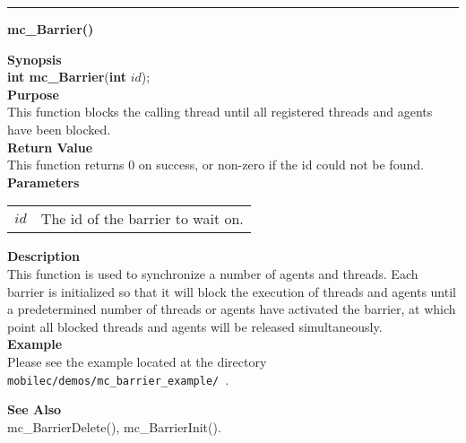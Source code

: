 \noindent
\vspace{5pt}
\rule{6.5in}{0.015in}
\noindent
{}
{\LARGE \bf mc\_Barrier()}\\
\label{api:mc_Barrier()}

\noindent
{\bf Synopsis}\\
{\bf int mc\_Barrier}({\bf int} $id$);\\

\noindent
{\bf Purpose}\\
This function blocks the calling thread until all registered threads and
agents have been blocked. \\

\noindent
{\bf Return Value}\\
This function returns 0 on success, or non-zero if the id could not be found. \\

\noindent
{\bf Parameters}
\vspace{-0.1pt}
\begin{description}
\item
\begin{tabular}{p{10 mm}p{145 mm}} 
$id$ & The id of the barrier to wait on. 
\end{tabular}
\end{description}

\noindent
{\bf Description}\\
This function is used to synchronize a number of agents and threads. Each barrier
is initialized so that it will block the execution of threads and agents until 
a predetermined number of threads or agents have activated the barrier, at which
point all blocked threads and agents will be released simultaneously. 
    \\

\noindent
{\bf Example}\\
Please see the example located at the directory
\texttt{ mobilec/demos/mc\_barrier\_example/ }. \\

\noindent

\noindent
{\bf See Also}\\
mc\_BarrierDelete(), mc\_BarrierInit(). \\

